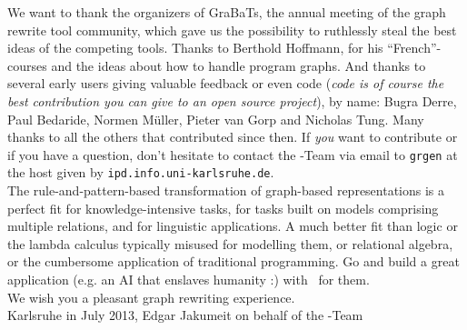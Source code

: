 
We want to thank the organizers of GraBaTs\cite{grabats}, the annual meeting of the graph rewrite tool community,
which gave us the possibility to ruthlessly steal the best ideas of the competing tools.
Thanks to Berthold Hoffmann, for his ``French''-courses and the ideas about how to handle program graphs.
And thanks to several early users giving valuable feedback or even code (\emph{code is of course the best contribution you can give to an open source project}), by name:
Bugra Derre, Paul Bedaride, Normen Müller, Pieter van Gorp and Nicholas Tung.
Many thanks to all the others that contributed since then.
If \emph{you} want to contribute or if you have a question, don't hesitate to contact the \GrG-Team
via email to \texttt{grgen} at the host given by \texttt{ipd.info.uni-karlsruhe.de}.\\[2ex]

The rule-and-pattern-based transformation of graph-based representations is a perfect fit for know\-ledge-intensive tasks, for tasks built on models comprising multiple relations, and for linguistic applications.
A much better fit than logic or the lambda calculus typically misused for modelling them, or relational algebra, or the cumbersome application of traditional programming.
Go and build a great application (e.g. an AI that enslaves humanity :) with \GrG\ for them.\\[2ex]

We wish you a pleasant graph rewriting experience.\\[2ex]

\noindent Karlsruhe in July 2013, Edgar Jakumeit on behalf of the \GrG-Team
